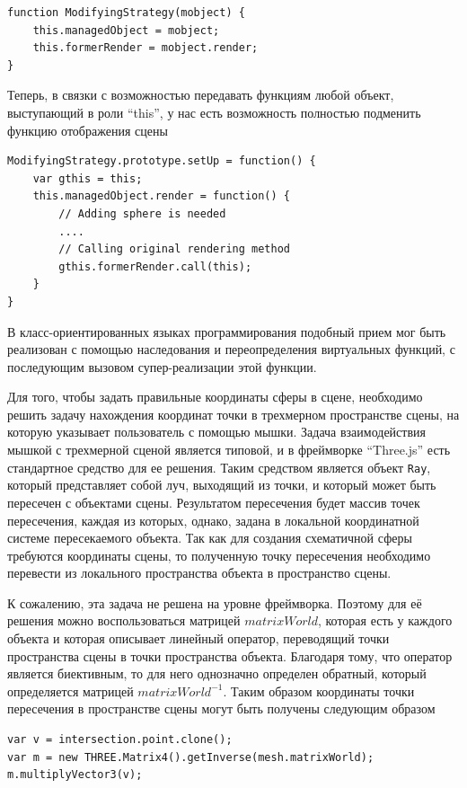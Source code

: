 \documentclass[12pt, a4paper]{article}
\begin{document}
\begin{lstlisting}
function ModifyingStrategy(mobject) {
    this.managedObject = mobject;
    this.formerRender = mobject.render;
}
\end{lstlisting}

Теперь, в связки с возможностью передавать функциям любой объект,
выступающий в роли ``this'', у нас есть возможность полностью подменить функцию
отображения сцены

\begin{lstlisting}
ModifyingStrategy.prototype.setUp = function() {
    var gthis = this;
    this.managedObject.render = function() {
        // Adding sphere is needed
        ....
        // Calling original rendering method
        gthis.formerRender.call(this);
    }
}
\end{lstlisting}

В класс-ориентированных языках программирования подобный прием мог быть
реализован с помощью наследования и переопределения
виртуальных функций, с последующим вызовом супер-реализации этой функции.

Для того, чтобы задать правильные координаты сферы в сцене, необходимо решить
задачу нахождения координат точки в трехмерном пространстве сцены, на которую
указывает пользователь с помощью мышки. Задача взаимодействия
мышкой с трехмерной сценой является типовой, и в фреймворке ``Three.js'' есть
стандартное
средство для ее решения. Таким средством является объект \texttt{Ray}, который
представляет собой луч, выходящий из точки, и который может быть пересечен с
объектами сцены. Результатом пересечения будет массив точек пересечения,
каждая из которых, однако, задана в локальной координатной системе пересекаемого
объекта. Так как для создания схематичной сферы требуются координаты сцены, то
полученную точку пересечения необходимо перевести из локального пространства
объекта в пространство сцены.

К сожалению, эта задача не решена на уровне фреймворка. Поэтому для её решения
можно
воспользоваться матрицей $matrixWorld$, которая
есть у каждого объекта и которая описывает линейный оператор, переводящий точки
пространства сцены в точки пространства объекта. Благодаря тому, что оператор
является биективным, то для него однозначно определен обратный, который
определяется матрицей $matrixWorld^{-1}$. Таким образом
координаты точки пересечения в пространстве сцены могут быть получены следующим
образом

\begin{lstlisting}
var v = intersection.point.clone();
var m = new THREE.Matrix4().getInverse(mesh.matrixWorld);
m.multiplyVector3(v);
\end{lstlisting}
\end{document}
